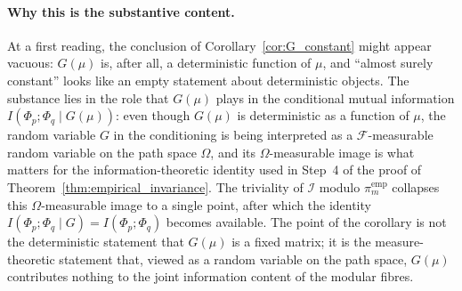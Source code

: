 \paragraph{Why this is the substantive content.}
At a first reading, the conclusion of Corollary~\ref{cor:G_constant}
might appear vacuous: $G(\mu)$ is, after all, a deterministic
function of $\mu$, and ``almost surely constant'' looks like an
empty statement about deterministic objects. The substance lies in
the role that $G(\mu)$ plays in the conditional mutual
information $I(\Phi_p; \Phi_q \mid G(\mu))$: even though
$G(\mu)$ is deterministic as a function of $\mu$, the random
variable $G$ in the conditioning is being interpreted as a
$\mathcal{F}$-measurable random variable on the path space $\Omega$,
and its $\Omega$-measurable image is what matters for the
information-theoretic identity used in Step~4 of the proof of
Theorem~\ref{thm:empirical_invariance}. The triviality of
$\mathcal{I}$ modulo $\pi_m^{\mathrm{emp}}$ collapses this
$\Omega$-measurable image to a single point, after which the
identity
$I(\Phi_p; \Phi_q \mid G) = I(\Phi_p; \Phi_q)$ becomes available.
The point of the corollary is not the deterministic statement that
$G(\mu)$ is a fixed matrix; it is the measure-theoretic statement
that, viewed as a random variable on the path space, $G(\mu)$
contributes nothing to the joint information content of the modular
fibres.
